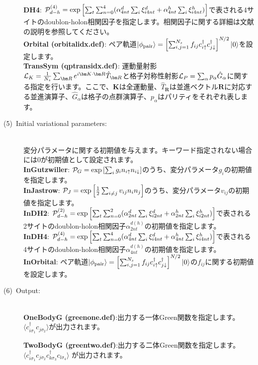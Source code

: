 \begin{description}
~\\{\bf DH4}:  ${\cal P}_{d-h}^{(4)}= \exp \left[ \sum_t \sum_{n=0}^4 (\alpha_{4nt}^d \sum_{i}\xi_{i4nt}^d+\alpha_{4nt}^h \sum_{i}\xi_{i4nt}^h)\right]$で表される4サイトのdoublon-holon相関因子を指定します。相関因子に関する詳細は文献\cite{Tahara2008}の説明を参照してください。
~\\{\bf Orbital (orbitalidx.def)}: ペア軌道$|\phi_{\rm pair} \rangle = \left[\sum_{i, j=1}^{N_s} f_{ij}c_{i\uparrow}^{\dag}c_{j\downarrow}^{\dag} \right]^{N/2}|0 \rangle$を設定します。
~\\{\bf TransSym (qptransidx.def)}: 運動量射影${\cal L}_K=\frac{1}{N_s}\sum_{{\bm R}}e^{i {\bm K} \cdot{\bm R} } \hat{T}_{\bm R}$と格子対称性射影${\cal L}_P=\sum_{\alpha}p_{\alpha} \hat{G}_{\alpha}$に関する指定を行います。ここで、${\bm K}$は全運動量、$\hat{T}_{\bm R}$は並進ベクトル${\bm R}$に対応する並進演算子、$\hat{G}_{\alpha}$は格子の点群演算子、$p_\alpha$はパリティをそれぞれ表します。

\item[(5)~Initial variational parameters:]
~\\ 変分パラメータに関する初期値を与えます。キーワード指定されない場合には$0$が初期値として設定されます。
~\\{\bf InGutzwiller}: ${\cal P}_G=\exp\left[ \sum_i g_i n_{i\uparrow} n_{i\downarrow} \right]$のうち、変分パラメータ$g_i$の初期値を指定します。
~\\{\bf InJastrow}: ${\cal P}_J=\exp\left[\frac{1}{2} \sum_{i\neq j} v_{ij} n_i n_j\right]$のうち、変分パラメータ$v_{ij}$の初期値を指定します。
~\\{\bf InDH2}:  ${\cal P}_{d-h}^{(2)}= \exp \left[ \sum_t \sum_{n=0}^2 (\alpha_{2nt}^d \sum_{i}\xi_{i2nt}^d+\alpha_{2nt}^h \sum_{i}\xi_{i2nt}^h)\right]$で表される2サイトのdoublon-holon相関因子$\alpha_{2nt}^{d(h)}$の初期値を指定します。
~\\{\bf InDH4}:  ${\cal P}_{d-h}^{(4)}= \exp \left[ \sum_t \sum_{n=0}^4 (\alpha_{4nt}^d \sum_{i}\xi_{i4nt}^d+\alpha_{4nt}^h \sum_{i}\xi_{i4nt}^h)\right]$で表される4サイトのdoublon-holon相関因子$\alpha_{4nt}^{d(h)}$の初期値を指定します。
~\\{\bf InOrbital}: ペア軌道$|\phi_{\rm pair} \rangle = \left[\sum_{i, j=1}^{N_s} f_{ij}c_{i\uparrow}^{\dag}c_{j\downarrow}^{\dag} \right]^{N/2}|0 \rangle$の$ f_{ij}$に関する初期値を設定します。


\item[(6)~Output:]
~\\{\bf OneBodyG (greenone.def)}:出力する一体Green関数を指定します。
 $\langle c^{\dagger}_{i\sigma_1}c_{j\sigma_2}\rangle$が出力されます。

 {\bf TwoBodyG (greentwo.def)}:出力する二体Green関数を指定します。
 $\langle c^{\dagger}_{i\sigma_1}c_{j\sigma_2}c^{\dagger}_{k \sigma_3}c_{l\sigma_4}\rangle$
が出力されます。
\end{description}
